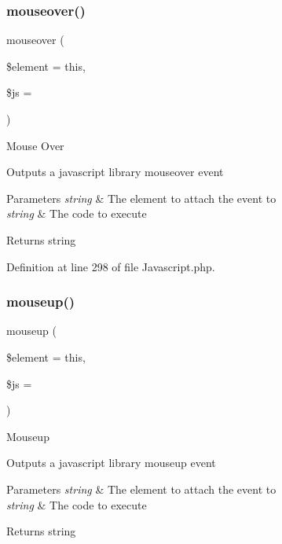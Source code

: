 \subsubsection{\texorpdfstring{mouseover()}{mouseover()}}
{\footnotesize\ttfamily mouseover (\begin{DoxyParamCaption}\item[{}]{\$element = {\ttfamily \textquotesingle{}this\textquotesingle{}},  }\item[{}]{\$js = {\ttfamily \textquotesingle{}\textquotesingle{}} }\end{DoxyParamCaption})}

Mouse Over

Outputs a javascript library mouseover event


\begin{DoxyParams}{Parameters}
{\em string} & The element to attach the event to \\
\hline
{\em string} & The code to execute \\
\hline
\end{DoxyParams}
\begin{DoxyReturn}{Returns}
string 
\end{DoxyReturn}


Definition at line 298 of file Javascript.\+php.

\mbox{\label{class_c_i___javascript_a31b2b5c28657895274f5658517a2342a}} 
\subsubsection{\texorpdfstring{mouseup()}{mouseup()}}
{\footnotesize\ttfamily mouseup (\begin{DoxyParamCaption}\item[{}]{\$element = {\ttfamily \textquotesingle{}this\textquotesingle{}},  }\item[{}]{\$js = {\ttfamily \textquotesingle{}\textquotesingle{}} }\end{DoxyParamCaption})}

Mouseup

Outputs a javascript library mouseup event


\begin{DoxyParams}{Parameters}
{\em string} & The element to attach the event to \\
\hline
{\em string} & The code to execute \\
\hline
\end{DoxyParams}
\begin{DoxyReturn}{Returns}
string 
\end{DoxyReturn}


